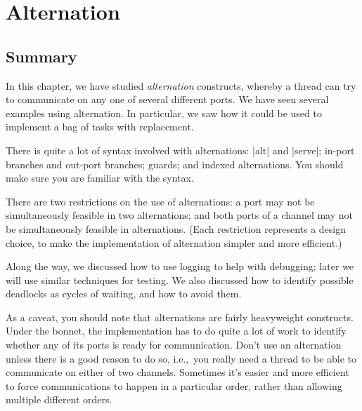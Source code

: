 \chapter{Alternation} 
\label{chap:alts}



\section{Summary}

In this chapter, we have studied \emph{alternation} constructs, whereby a
thread can try to communicate on any one of several different ports.  We
have seen several examples using alternation.  In particular, we saw how it
could be used to implement a bag of tasks with replacement. 

There is quite a lot of syntax involved with alternations: |alt| and |serve|;
in-port branches and out-port branches; guards; and indexed alternations.  You
should make sure you are familiar with the syntax.

There are two restrictions on the use of alternations: a port may not be
simultaneously feasible in two alternations; and both ports of a channel may
not be simultaneously feasible in alternations.  (Each restriction represents
a design choice, to make the implementation of alternation simpler and more
efficient.)

Along the way, we discussed how to use logging to help with debugging; later
we will use similar techniques for testing.  We also discussed how to identify
possible deadlocks as cycles of waiting, and how to avoid them.

As a caveat, you should note that alternations are fairly heavyweight
constructs.  Under the bonnet, the implementation has to do quite a lot of
work to identify whether any of its ports is ready for communication.  Don't
use an alternation unless there is a good reason to do so, i.e.,~you really
need a thread to be able to communicate on either of two channels.  Sometimes
it's easier and more efficient to force communications to happen in a
particular order, rather than allowing multiple different orders.

